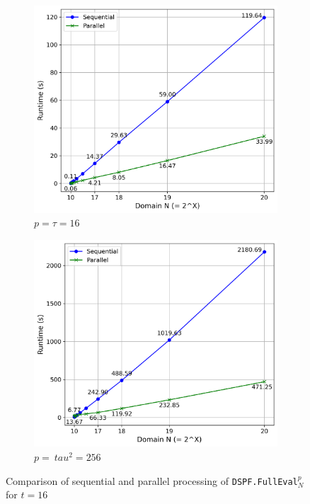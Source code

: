 \begin{figure}[t]
    \hspace{-1em}
    \begin{subfigure}[b]{0.5\textwidth}
        \centering
        \includegraphics[scale=0.49]{images/plots/full_eval_t16.png}
        \caption{$p = \tau = 16$}
    \end{subfigure}
    \hspace{0em}
    \begin{subfigure}[b]{0.5\textwidth}
        \centering
        \includegraphics[scale=0.49]{images/plots/full_eval_t256.png}
        \caption{$p =\ tau^2 = 256$}
    \end{subfigure}
    \label{fig:fullEvalChart}
    \caption{Comparison of sequential and parallel processing of \texttt{DSPF.FullEval}$_N^p$ for $t=16$}
\end{figure}

